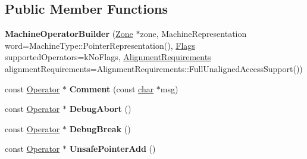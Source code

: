 \subsection*{Public Member Functions}
\begin{DoxyCompactItemize}
\item 
\mbox{\label{classv8_1_1internal_1_1compiler_1_1MachineOperatorBuilder_acbeaf35f975007f8ce7ebb1acce32a45}} 
{\bfseries Machine\+Operator\+Builder} (\mbox{\hyperlink{classv8_1_1internal_1_1Zone}{Zone}} $\ast$zone, Machine\+Representation word=Machine\+Type\+::\+Pointer\+Representation(), \mbox{\hyperlink{classv8_1_1base_1_1Flags}{Flags}} supported\+Operators=k\+No\+Flags, \mbox{\hyperlink{classv8_1_1internal_1_1compiler_1_1MachineOperatorBuilder_1_1AlignmentRequirements}{Alignment\+Requirements}} alignment\+Requirements=Alignment\+Requirements\+::\+Full\+Unaligned\+Access\+Support())
\item 
\mbox{\label{classv8_1_1internal_1_1compiler_1_1MachineOperatorBuilder_a42deddacdc4a0056f7f79f8a0e073785}} 
const \mbox{\hyperlink{classv8_1_1internal_1_1compiler_1_1Operator}{Operator}} $\ast$ {\bfseries Comment} (const \mbox{\hyperlink{classchar}{char}} $\ast$msg)
\item 
\mbox{\label{classv8_1_1internal_1_1compiler_1_1MachineOperatorBuilder_a1c45fc1ab628663d0f453d6c8e01e937}} 
const \mbox{\hyperlink{classv8_1_1internal_1_1compiler_1_1Operator}{Operator}} $\ast$ {\bfseries Debug\+Abort} ()
\item 
\mbox{\label{classv8_1_1internal_1_1compiler_1_1MachineOperatorBuilder_a97d592cedc6c21a30cf4af5433d5020b}} 
const \mbox{\hyperlink{classv8_1_1internal_1_1compiler_1_1Operator}{Operator}} $\ast$ {\bfseries Debug\+Break} ()
\item 
\mbox{\label{classv8_1_1internal_1_1compiler_1_1MachineOperatorBuilder_a90509bd20690a338d76950894ba8a7a7}} 
const \mbox{\hyperlink{classv8_1_1internal_1_1compiler_1_1Operator}{Operator}} $\ast$ {\bfseries Unsafe\+Pointer\+Add} ()
\item 

\end{DoxyCompactItemize}
